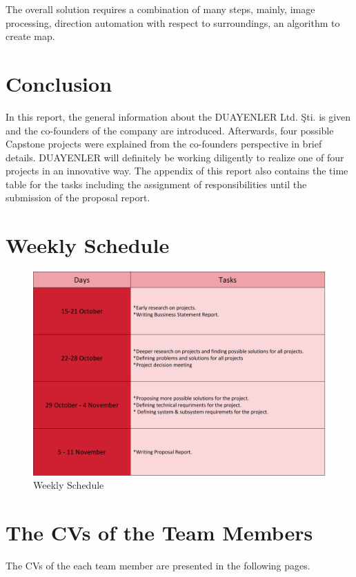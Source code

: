 \documentclass[a4paper,12pt]{article}
\begin{document}
The overall solution requires a combination of many steps, mainly, image processing, direction automation with respect to surroundings, an algorithm to create map.


\section{Conclusion}
	In this report, the general information about the DUAYENLER Ltd. Şti. is given and the co-founders of the company are introduced. Afterwards, four possible Capstone projects were explained from the co-founders perspective in brief details. DUAYENLER will definitely be working diligently to realize one of four projects in an innovative way. The appendix of this report also contains the time table for the tasks including the assignment of responsibilities until the submission of the proposal report.

\begin{appendices}
	\renewcommand\thefigure{\thesection.\arabic{figure}}
	\setcounter{figure}{0}
	\section{Weekly Schedule}\label{weekly-sch}
	
\begin{figure}[H]
	\centering
	\includegraphics[width=\textwidth,height=\textheight,keepaspectratio]{images/schedule} 
	\caption{\label{fig:schedule}Weekly Schedule}
	
\end{figure}

	\section{The CVs of the Team Members}\label{appendix-cvs}
	The CVs of the each team member are presented in the following pages.
	
	
\end{appendices}
\end{document}

